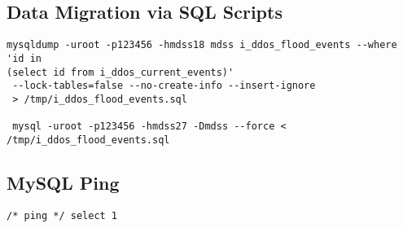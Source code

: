 \subsection{Data Migration via SQL Scripts}

\begin{verbatim}
mysqldump -uroot -p123456 -hmdss18 mdss i_ddos_flood_events --where 'id in
(select id from i_ddos_current_events)'
 --lock-tables=false --no-create-info --insert-ignore 
 > /tmp/i_ddos_flood_events.sql
 
 mysql -uroot -p123456 -hmdss27 -Dmdss --force < /tmp/i_ddos_flood_events.sql
\end{verbatim}

\subsection{MySQL Ping}
\begin{verbatim}
/* ping */ select 1
\end{verbatim}



